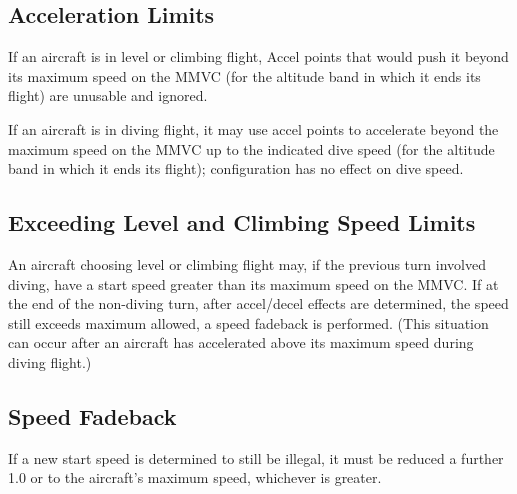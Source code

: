 \subsection{Acceleration Limits} If an aircraft is in level or climbing flight, Accel points that would push it beyond its maximum speed on the MMVC (for the altitude band in which it ends its flight) are unusable and ignored. 

If an aircraft is in diving flight, it may use accel points to accelerate beyond the maximum speed on the MMVC up to the indicated dive speed (for the altitude band in which it ends its flight); configuration has no effect on dive speed. 

\subsection{Exceeding Level and Climbing Speed Limits} An aircraft choosing level or climbing flight may, if the previous turn involved diving, have a start speed greater than its maximum speed on the MMVC. If at the end of the non-diving turn, after accel/decel effects are determined, the speed still exceeds maximum allowed, a speed fadeback is performed. (This situation can occur after an aircraft has accelerated above its maximum speed during diving flight.)

\subsection{Speed Fadeback} If a new start speed is determined to still be illegal, it must be reduced a further 1.0 or to the aircraft's maximum speed, whichever is greater. 


